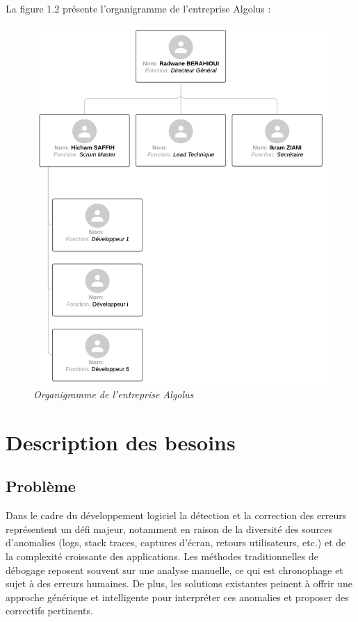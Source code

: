 \documentclass[12pt,a4paper]{report}
\begin{document}
	La figure 1.2 présente l'organigramme de l'entreprise Algolus :
	
	\begin{figure}[H]
		\centering
		\includegraphics[width=1\textwidth]{algolus-organigramme.png}
		\caption{\textit{Organigramme de l'entreprise Algolus}}
		\label{fig:algolus-organigramme}
	\end{figure}
	
	\section{Description des besoins}
	
	\subsection{Problème}
	
	Dans le cadre du développement logiciel la détection et la correction des erreurs représentent un défi majeur, notamment en raison de la diversité des sources d’anomalies (logs, stack traces, captures d’écran, retours utilisateurs, etc.) et de la complexité croissante des applications. Les méthodes traditionnelles de débogage reposent souvent sur une analyse manuelle, ce qui est chronophage et sujet à des erreurs humaines. De plus, les solutions existantes peinent à offrir une approche générique et intelligente pour interpréter ces anomalies et proposer des correctifs pertinents.
	
\end{document}
